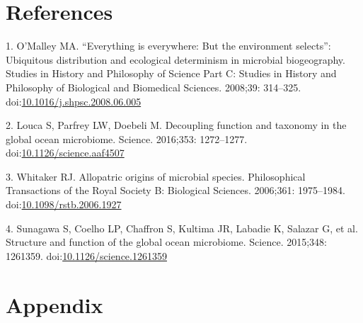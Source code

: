 \documentclass[12pt,a4paper,]{article}
\begin{document}
\section{References}\label{references}

\hypertarget{refs}{}
\hypertarget{ref-omalley_everything_2008}{}
1. O'Malley MA. ``Everything is everywhere: But the environment
selects'': Ubiquitous distribution and ecological determinism in
microbial biogeography. Studies in History and Philosophy of Science
Part C: Studies in History and Philosophy of Biological and Biomedical
Sciences. 2008;39: 314--325.
doi:\href{https://doi.org/10.1016/j.shpsc.2008.06.005}{10.1016/j.shpsc.2008.06.005}

\hypertarget{ref-louca_decoupling_2016}{}
2. Louca S, Parfrey LW, Doebeli M. Decoupling function and taxonomy in
the global ocean microbiome. Science. 2016;353: 1272--1277.
doi:\href{https://doi.org/10.1126/science.aaf4507}{10.1126/science.aaf4507}

\hypertarget{ref-whitaker_allopatric_2006}{}
3. Whitaker RJ. Allopatric origins of microbial species. Philosophical
Transactions of the Royal Society B: Biological Sciences. 2006;361:
1975--1984.
doi:\href{https://doi.org/10.1098/rstb.2006.1927}{10.1098/rstb.2006.1927}

\hypertarget{ref-sunagawa_structure_2015}{}
4. Sunagawa S, Coelho LP, Chaffron S, Kultima JR, Labadie K, Salazar G,
et al. Structure and function of the global ocean microbiome. Science.
2015;348: 1261359.
doi:\href{https://doi.org/10.1126/science.1261359}{10.1126/science.1261359}

\section{Appendix}\label{appendix}

\tiny
\end{document}
